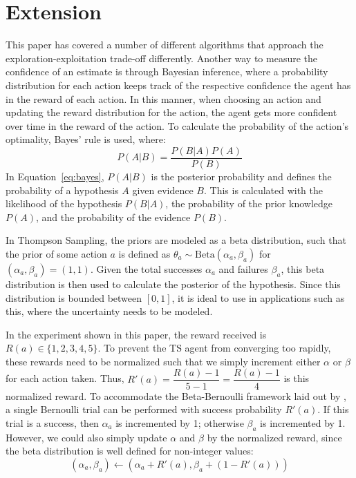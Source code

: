 \documentclass[sigconf,nonacm]{acmart}
\begin{document}
\section{Extension}

This paper has covered a number of different algorithms that approach the exploration-exploitation trade-off differently. Another way to measure the confidence of an estimate is through Bayesian inference, where a probability distribution for each action keeps track of the respective confidence the agent has in the reward of each action. In this manner, when choosing an action and updating the reward distribution for the action, the agent gets more confident over time in the reward of the action. To calculate the probability of the action's optimality, Bayes' rule is used, where:
\begin{equation}
    P(A|B)=\frac{P(B|A)P(A)}{P(B)}
    \label{eq:bayes}
\end{equation}
In Equation~\ref{eq:bayes}, $P(A|B)$ is the posterior probability and defines the probability of a hypothesis $A$ given evidence $B$. This is calculated with the likelihood of the hypothesis $P(B|A)$, the probability of the prior knowledge $P(A)$, and the probability of the evidence $P(B)$.

In Thompson Sampling, the priors are modeled as a beta distribution, such that the prior of some action $a$ is defined as $\theta_a\sim \text{Beta}(\alpha_a,\beta_a)$ for $(\alpha_a,\beta_a) = (1,1)$. Given the total successes $\alpha_a$ and failures $\beta_a$, this beta distribution is then used to calculate the posterior of the hypothesis. Since this distribution is bounded between $[0,1]$, it is ideal to use in applications such as this, where the uncertainty needs to be modeled.

In the experiment shown in this paper, the reward received is $R(a)\in\{1,2,3,4,5\}$. To prevent the TS agent from converging too rapidly, these rewards need to be normalized such that we simply increment either $\alpha$ or $\beta$ for each action taken. Thus, $R'(a)=\dfrac{R(a)-1}{5-1}=\dfrac{R(a)-1}{4}$ is this normalized reward. To accommodate the Beta-Bernoulli framework laid out by \citet{russo2020tutorialthompsonsampling}, a single Bernoulli trial can be performed with success probability $R'(a)$. If this trial is a success, then $\alpha_a$ is incremented by 1; otherwise $\beta_a$ is incremented by 1. However, we could also simply update $\alpha$ and $\beta$ by the normalized reward, since the beta distribution is well defined for non-integer values:
\begin{equation}
    (\alpha_a,\beta_a)\leftarrow(\alpha_a+R'(a),\beta_a+(1-R'(a)))
\end{equation}
\end{document}
